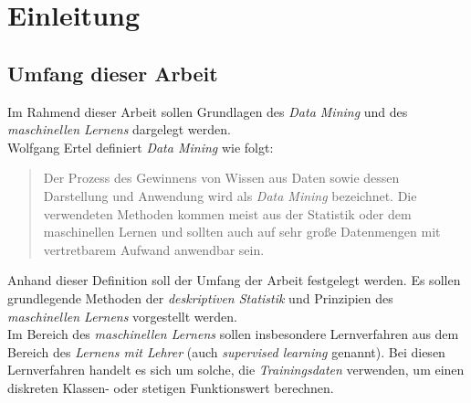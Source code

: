 \documentclass[fontsize=11pt]{scrartcl}
\author{Janek Boll}
\author{Steven Minich}
\date{\today}
\newcommand{\blankpage}{
\newpage
\thispagestyle{empty}
\mbox{}
\newpage
}
\begin{document}
    

    \blankpage

    
    \newpage
    

    \blankpage
    
    \vspace*{\fill}
    
    \begin{abstract}
        \lipsum[1]
    \end{abstract}
    \vspace*{\fill}
    
    \newpage
    
    \tableofcontents
    
    \newpage

        \section{Einleitung}
            \subsection{Umfang dieser Arbeit}
                Im Rahmend dieser Arbeit sollen Grundlagen des \emph{Data Mining} und des \emph{maschinellen Lernens} dargelegt werden.\\
                Wolfgang Ertel definiert \emph{Data Mining} wie folgt:\\
                \begin{quote}
                    \glqq Der Prozess des Gewinnens von Wissen aus Daten sowie dessen Darstellung und Anwendung wird als \emph{Data Mining} bezeichnet. Die verwendeten Methoden kommen meist aus der Statistik oder dem maschinellen Lernen und sollten auch auf sehr große Datenmengen mit vertretbarem Aufwand anwendbar sein.\grqq    
                \end{quote}

                Anhand dieser Definition soll der Umfang der Arbeit festgelegt werden. Es sollen grundlegende Methoden der \emph{deskriptiven Statistik} und Prinzipien des \emph{maschinellen Lernens} vorgestellt werden.\\
                Im Bereich des \emph{maschinellen Lernens} sollen insbesondere Lernverfahren aus dem Bereich des \emph{Lernens mit Lehrer} (auch \emph{supervised learning} genannt). Bei diesen Lernverfahren handelt es sich um solche, die \emph{Trainingsdaten} verwenden, um einen diskreten Klassen- oder stetigen Funktionswert berechnen. \cite{ertel2016}
\end{document}
